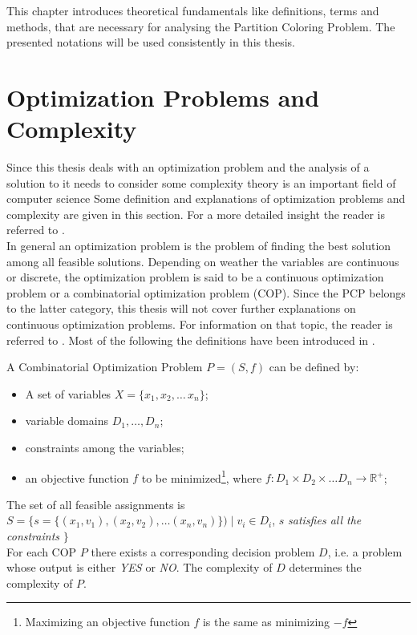 This chapter introduces theoretical fundamentals like definitions, terms and methods, that are necessary for analysing the Partition Coloring Problem. The presented notations will be used consistently in this thesis. 
\section{Optimization Problems and Complexity}
Since this thesis deals with an optimization problem and the analysis of a solution to it needs to consider some complexity theory is an important field of computer science
Some definition and explanations of optimization problems and complexity are given in this section.
For a more detailed insight the reader is referred to \cite{lawler-01,papadimitriou-94,garey-79}.\\
In general an optimization problem is the problem of finding the best solution among all feasible solutions. Depending on weather the variables are continuous or discrete, the optimization problem is said to be a continuous optimization problem or a combinatorial optimization problem (COP). Since the PCP belongs to the latter category, this thesis will not cover further explanations on continuous optimization problems. For information on that topic, the reader is referred to \cite{nocedal-00, pardalos-02}. Most of the following the definitions have been introduced in \cite{blum-05, neumann-10}.
\begin{definition}
A Combinatorial Optimization Problem $P = (S, f)$ can be defined by: 
\begin{itemize}
\item A set of variables $X=\{x_1,x_2,\ldots \,x_n\}$;
\item variable domains $D_1,\ldots , D_n$;
\item constraints among the variables;
\item an objective function $f$ to be minimized\footnote[1]{Maximizing an objective function $f$ is the same as minimizing $- f$}, where $f : D_1 \times D_2 \times \ldots D_n \rightarrow \mathbb{R}^+$;
\end{itemize}
\end{definition}
The set of all feasible assignments is $S = \{s=\{(x_1,v_1),(x_2,v_2),\ldots (x_n,v_n)\}) \mid v_i \in D_i$, $s$ \textit{satisfies all the constraints} $\}$\\
For each COP $P$ there exists a corresponding decision problem $D$, i.e. a problem whose output is either \textit{YES} or \textit{NO}. The complexity of $D$ determines the complexity of $P$.
